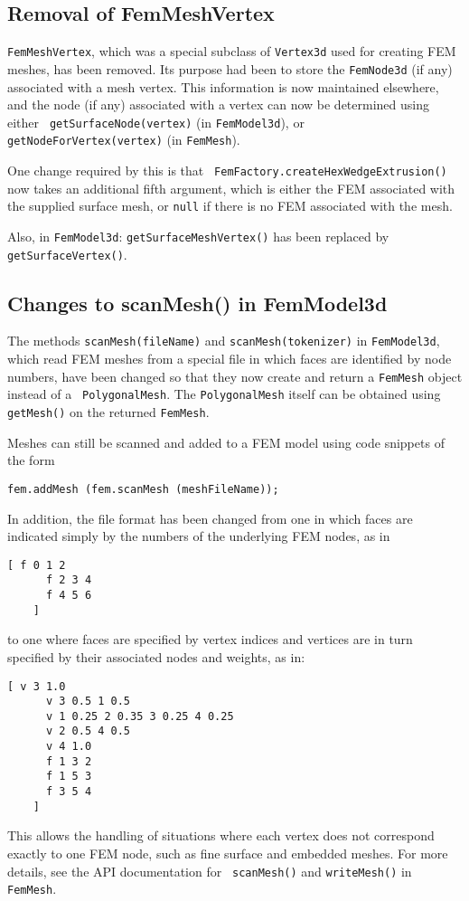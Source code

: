 \documentclass{article}
\begin{document}
\subsection*{Removal of FemMeshVertex}

{\tt FemMeshVertex}, which was a special subclass of {\tt Vertex3d}
used for creating FEM meshes, has been removed. Its purpose had been
to store the {\tt FemNode3d} (if any) associated with a mesh vertex.
This information is now maintained elsewhere, and the node (if any)
associated with a vertex can now be determined using either {\tt
getSurfaceNode(vertex)} (in {\tt FemModel3d}), or {\tt
getNodeForVertex(vertex)} (in {\tt FemMesh}).

One change required by this is that {\tt
FemFactory.createHexWedgeExtrusion()} now takes an additional fifth
argument, which is either the FEM associated with the supplied surface
mesh, or {\tt null} if there is no FEM associated with the mesh.

Also, in {\tt FemModel3d}: {\tt getSurfaceMeshVertex()} has been
replaced by {\tt getSurfaceVertex()}.

\subsection*{Changes to scanMesh() in FemModel3d}

The methods {\tt scanMesh(fileName)} and {\tt scanMesh(tokenizer)} in
{\tt FemModel3d}, which read FEM meshes from a special file in which
faces are identified by node numbers, have been changed so that they
now create and return a {\tt FemMesh} object instead of a {\tt
PolygonalMesh}. The {\tt PolygonalMesh} itself can be obtained using {\tt
getMesh()} on the returned {\tt FemMesh}.

Meshes can still be scanned and added to a FEM model using
code snippets of the form
%
\begin{lstlisting}[]
   fem.addMesh (fem.scanMesh (meshFileName));
\end{lstlisting}
%

In addition, the file format has been changed from one in which faces
are indicated simply by the numbers of the underlying FEM nodes, as in
%
\begin{lstlisting}[]
    [ f 0 1 2
      f 2 3 4
      f 4 5 6
    ]
\end{lstlisting}
%
to one where faces are specified by vertex indices and vertices are in
turn specified by their associated nodes and weights, as in:
%
\begin{lstlisting}[]
    [ v 3 1.0
      v 3 0.5 1 0.5
      v 1 0.25 2 0.35 3 0.25 4 0.25
      v 2 0.5 4 0.5
      v 4 1.0
      f 1 3 2
      f 1 5 3
      f 3 5 4
    ]
\end{lstlisting}
%
This allows the handling of situations where each vertex does not
correspond exactly to one FEM node, such as fine surface and embedded
meshes. For more details, see the API documentation for {\tt
scanMesh()} and {\tt writeMesh()} in {\tt FemMesh}.
\end{document}
